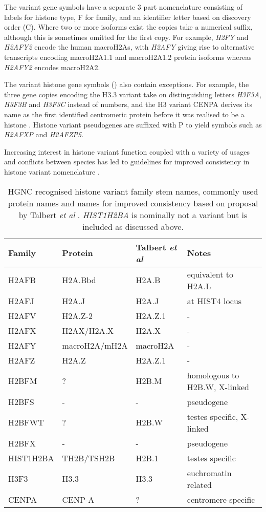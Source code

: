 	The variant gene symbols have a separate 3 part nomenclature 
	consisting of labels for histone type, F for family, 
	and an identifier letter based on discovery order (C).
	Where two or more isoforms exist the copies take a numerical suffix, 
	although this is sometimes omitted for the first copy. 
	For example, \textit{H2FY} and \textit{H2AFY2} encode the human macroH2As, 
	with \textit{H2AFY} giving rise to alternative transcripts encoding macroH2A1.1 and macroH2A1.2 protein isoforms 
	whereas \textit{H2AFY2} encodes macroH2A2.

	The variant histone gene symbols () also contain exceptions.
	For example, the three gene copies encoding the H3.3 variant 
	take on distinguishing letters \textit{H3F3A}, \textit{H3F3B} and \textit{H3F3C} instead of numbers, 
	and the H3 variant CENPA derives its name as the first identified centromeric protein \cite{CENPA-first-report} 
	before it was realised to be a histone \citep{CENPA-copurifies-histones, CENPA-sequence-analysis}.
	Histone variant pseudogenes are suffixed with P to yield symbols such as \textit{H2AFXP} and \textit{H2AFZP5}.

	Increasing interest in histone variant function \citep{MazeAllis2014}
	coupled with a variety of usages and conflicts between species 
	has led to guidelines for improved consistency in histone variant nomenclature \citep{Talbert2012}.

\begin{table*}
	\caption{HGNC recognised histone variant family stem names, commonly used protein names 
	and names for improved consistency based on proposal by Talbert \textit{et al} \citep{Talbert2012}. 
	\textit{HIST1H2BA} is nominally not a variant but is included as discussed above.}
	\label{tab:histone-variant-families}
	\centering
	\begin{tabular}{l l l l}
	\toprule
	Family & Protein & Talbert \textit{et al} & Notes \\
	\midrule
	H2AFB & H2A.Bbd & H2A.B & equivalent to H2A.L \\
	H2AFJ & H2A.J & H2A.J & at HIST4 locus \\
	H2AFV & H2A.Z-2 & H2A.Z.1 & - \\
	H2AFX & H2AX/H2A.X & H2A.X & - \\
	H2AFY & macroH2A/mH2A & macroH2A & - \\
	H2AFZ & H2A.Z & H2A.Z.1 & - \\
	H2BFM & ? & H2B.M & homologous to H2B.W, X-linked\\
	H2BFS & - & - & pseudogene \\
	H2BFWT & ? & H2B.W & testes specific, X-linked \\
	H2BFX & - & - & pseudogene \\
	HIST1H2BA & TH2B/TSH2B & H2B.1 & testes specific \\
	H3F3 & H3.3 & H3.3 & euchromatin related \\
	CENPA & CENP-A & ? & centromere-specific \\
	\bottomrule
	\end{tabular}
\end{table*}